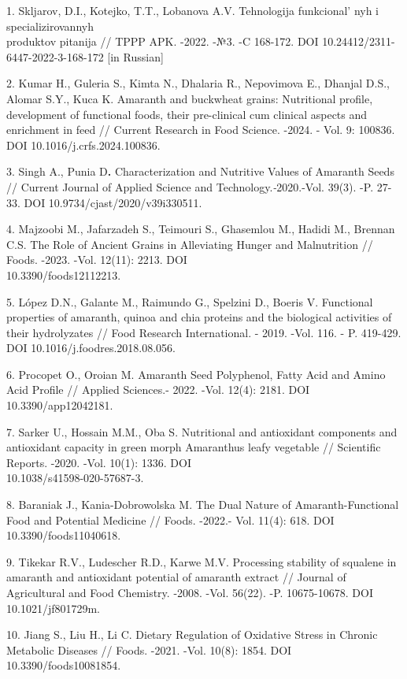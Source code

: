\begin{references}
1. Skljarov, D.I., Kotejko, T.T., Lobanova A.V. Tehnologija
funkcional' nyh i specializirovannyh \\produktov pitanija
// TPPP APK. -2022. -№3. -C 168-172.
DOI 10.24412/2311-6447-2022-3-168-172 {[}in Russian{]}

2. Kumar H., Guleria S., Kimta N., Dhalaria R., Nepovimova E., Dhanjal
D.S., Alomar S.Y., Kuca K. Amaranth and buckwheat grains: Nutritional
profile, development of functional foods, their pre-clinical cum
clinical aspects and enrichment in feed // Current Research in Food
Science. -2024. - Vol. 9: 100836. DOI 10.1016/j.crfs.2024.100836.

3. Singh A., Punia D{\bfseries .} Characterization and Nutritive Values of
Amaranth Seeds // Current Journal of Applied Science and
Technology.\emph{-}2020.-Vol. 39(3). -P. 27-33.
DOI 10.9734/cjast/2020/v39i330511.

4. Majzoobi M., Jafarzadeh S., Teimouri S., Ghasemlou M., Hadidi M.,
Brennan C.S. The Role of Ancient Grains in Alleviating Hunger and
Malnutrition // Foods. -2023. -Vol. 12(11): 2213.
DOI \\10.3390/foods12112213.

5. López D.N., Galante M., Raimundo G., Spelzini D., Boeris V. Functional
properties of amaranth, quinoa and chia proteins and the biological
activities of their hydrolyzates // Food Research International. - 2019.
-Vol. 116. - P. 419-429. DOI 10.1016/j.foodres.2018.08.056.

6. Procopet O., Oroian M. Amaranth Seed Polyphenol, Fatty Acid and Amino
Acid Profile // Applied Sciences.- 2022. -Vol. 12(4): 2181. DOI
10.3390/app12042181.

7. Sarker U., Hossain M.M., Oba S. Nutritional and antioxidant
components and antioxidant capacity in green morph Amaranthus leafy
vegetable // Scientific Reports. -2020. -Vol. 10(1): 1336. DOI\\
10.1038/s41598-020-57687-3.

8. Baraniak J., Kania-Dobrowolska M. The Dual Nature of
Amaranth-Functional Food and Potential Medicine // Foods. -2022.- Vol.
11(4): 618. DOI 10.3390/foods11040618.

9. Tikekar R.V., Ludescher R.D., Karwe M.V. Processing stability
of squalene in amaranth and antioxidant potential of amaranth extract //
Journal of Agricultural and Food Chemistry. -2008. -Vol. 56(22). -P.
10675-10678. DOI 10.1021/jf801729m.

10. Jiang S., Liu H., Li C. Dietary Regulation of Oxidative Stress in
Chronic Metabolic Diseases // Foods. -2021. -Vol. 10(8): 1854. DOI
10.3390/foods10081854.


\end{references}
